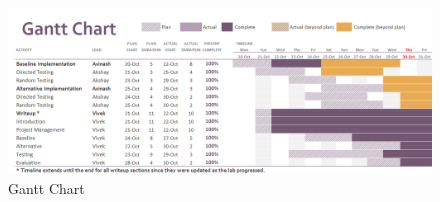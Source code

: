 \documentclass[10pt]{article}
\begin{document}





\begin{figure}[b]
\centering
\includegraphics[scale=0.5, angle=90]{gantt}
\caption{Gantt Chart}
\label{fig:gantt}
\end{figure}

\end{document}
